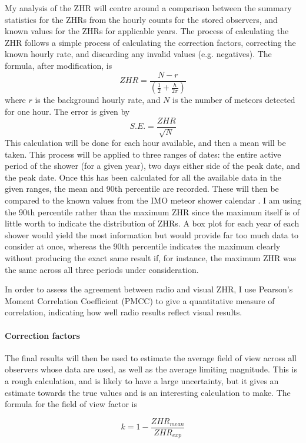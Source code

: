 My analysis of the ZHR will centre around a comparison between the summary
statistics for the ZHRs from the hourly counts for the stored observers, and
known values for the ZHRs for applicable years. The process of calculating the
ZHR follows a simple process of calculating the correction factors, correcting
the known hourly rate, and discarding any invalid values (e.g. negatives). The
formula, after modification, is
\[ {ZHR} = \frac{N - r}{\left( \frac{1}{2} + \frac{h}{2\pi} \right)} \] 
where $r$ is the background hourly rate, and $N$ is
the number of meteors detected for one hour. The error is given by 
\[ {S.E.} = \frac{{ZHR}}{\sqrt{N}}\] 
This calculation will be done for each hour available,
and then a mean will be taken. This process will be applied to three ranges of
dates: the entire active period of the shower (for a given year), two days
either side of the peak date, and the peak date. Once this has been calculated
for all the available data in the given ranges, the mean and 90th percentile
are recorded. These will then be compared to the known values from the IMO
meteor shower calendar \cite{imo_meteor_calendar}. I am using the 90th
percentile rather than the maximum ZHR since the maximum itself is of little
worth to indicate the distribution of ZHRs. A box plot for each year of each
shower would yield the most information but would provide far too much data to
consider at once, whereas the 90th percentile indicates the maximum clearly
without producing the exact same result if, for instance, the maximum ZHR was
the same across all three periods under consideration. 

In order to assess the agreement between radio and visual ZHR, I use Pearson's
Moment Correlation Coefficient (PMCC) to give a quantitative measure of
correlation, indicating how well radio results reflect visual results.

\paragraph{Correction factors\\}

The final results will then be used to estimate the average field of view
across all observers whose data are used, as well as the average limiting
magnitude. This is a rough calculation, and is likely to have a large
uncertainty, but it gives an estimate towards the true values and is an
interesting calculation to make. The formula for the field of view factor is

\[ k = 1 - \frac{{ZHR}_{mean}}{{ZHR}_{exp}} \]

